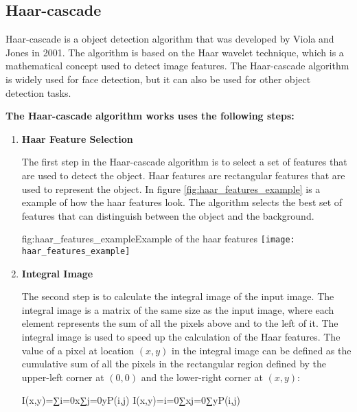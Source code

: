     \subsection{Haar-cascade}
    Haar-cascade is a object detection algorithm that was developed by Viola and Jones in 2001. 
    The algorithm is based on the Haar wavelet technique, which is a mathematical concept used to detect image features. 
    The Haar-cascade algorithm is widely used for face detection, but it can also be used for other object detection tasks.
    \cite{hrcs:haar-cascades}

        \textbf{The Haar-cascade algorithm works uses the following steps:}
        \begin{enumerate}
            
            \item \textbf{Haar Feature Selection}
        
            The first step in the Haar-cascade algorithm is to select a set of features that are used to detect the object. 
            Haar features are rectangular features that are used to represent the object. In figure \ref{fig:haar_features_example} is a example of how the haar features look. 
            The algorithm selects the best set of features that can distinguish between the object and the background.

            \begin{linfigure}{fig:haar_features_example}{Example of the haar features}
                \texttt{[image: haar\_features\_example]}
            \end{linfigure}
                
            \item \textbf{Integral Image}
        
            The second step is to calculate the integral image of the input image. The integral image is a matrix of the same size as the input image, where each element represents the sum of all the pixels above and to the left of it. 
            The integral image is used to speed up the calculation of the Haar features. 
            The value of a pixel at location $(x,y)$ in the integral image can be defined as the cumulative sum of all the pixels in the rectangular region defined by the upper-left corner at $(0,0)$ and the lower-right corner at $(x,y)$:
            
            I(x,y)=∑i=0x∑j=0yP(i,j)
            I(x,y)=i=0∑x​j=0∑y​P(i,j)
            

\end{enumerate}
